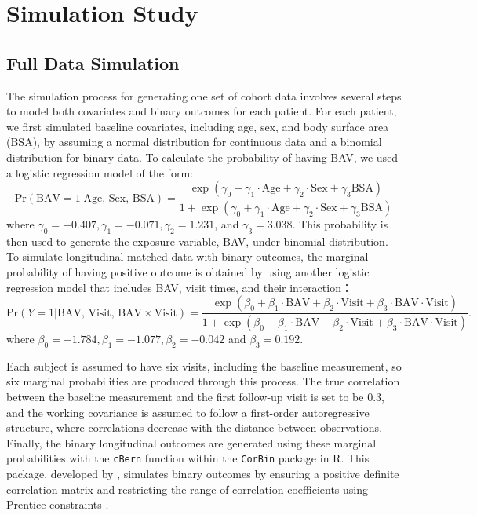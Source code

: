 \documentclass[
]{aft}
\begin{document}
\section{Simulation Study}\label{simulation-study}

\subsection{Full Data Simulation}\label{full-data-simulation}

The simulation process for generating one set of cohort data involves
several steps to model both covariates and binary outcomes for each
patient. For each patient, we first simulated baseline covariates,
including age, sex, and body surface area (BSA), by assuming a normal
distribution for continuous data and a binomial distribution for binary
data. To calculate the probability of having BAV, we used a logistic
regression model of the form: \[
\text{Pr}(\text{BAV} = 1 | \text{Age, Sex, BSA}) = \frac{\exp(\gamma_0 + \gamma_1 \cdot \text{Age} + \gamma_2 \cdot \text{Sex} + \gamma_3 \text{BSA})}{1+\exp(\gamma_0 + \gamma_1 \cdot \text{Age} + \gamma_2 \cdot \text{Sex} + \gamma_3 \text{BSA})}
\] where \(\gamma_0 = -0.407, \gamma_1 = -0.071, \gamma_2 = 1.231\), and
\(\gamma_3 = 3.038\). This probability is then used to generate the
exposure variable, BAV, under binomial distribution. To simulate
longitudinal matched data with binary outcomes, the marginal probability
of having positive outcome is obtained by using another logistic
regression model that includes BAV, visit times, and their interaction：
\[
\text{Pr}(Y = 1 | \text{BAV, Visit, BAV} \times \text{Visit}) = \frac{\exp(\beta_0 + \beta_1 \cdot \text{BAV} + \beta_2 \cdot \text{Visit} + \beta_3 \cdot \text{BAV}\cdot \text{Visit})}{1+\exp(\beta_0 + \beta_1 \cdot \text{BAV} + \beta_2 \cdot \text{Visit} + \beta_3 \cdot \text{BAV}\cdot \text{Visit})}.
\] where \(\beta_0 = -1.784, \beta_1 = -1.077, \beta_2 = -0.042\) and
\(\beta_3 = 0.192\).

Each subject is assumed to have six visits, including the baseline
measurement, so six marginal probabilities are produced through this
process. The true correlation between the baseline measurement and the
first follow-up visit is set to be 0.3, and the working covariance is
assumed to follow a first-order autoregressive structure, where
correlations decrease with the distance between observations. Finally,
the binary longitudinal outcomes are generated using these marginal
probabilities with the \texttt{cBern} function within the
\texttt{CorBin} package in R. This package, developed by
\citet{cbernWei}, simulates binary outcomes by ensuring a positive
definite correlation matrix and restricting the range of correlation
coefficients using Prentice constraints \citep{Prentice1988}.
\end{document}
